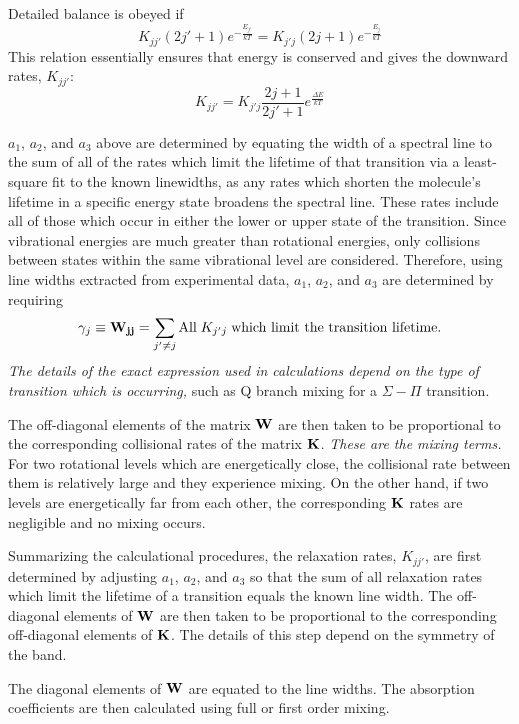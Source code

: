 \documentclass[11pt]{article}
\begin{document}
Detailed balance is obeyed if
\[
K_{jj'}(2j'+1)e^{-\frac{E_{j'}}{kT}}=K_{j'j}(2j+1)e^{-\frac{E_{j}}{kT}}
\]
This relation essentially ensures that energy is conserved and gives the
downward rates, $K_{jj'}$:
\[
K_{jj'}=K_{j'j} \frac{2j+1}{2j'+1} e^{\frac{\Delta E}{kT}}
\]

$a_{1}$, $a_{2}$, and $a_{3}$ above are determined 
by equating the width of a spectral line to the sum of all of the rates
which limit the lifetime of that transition via a least-square fit to the
known linewidths, as any rates which shorten the molecule's lifetime in a 
specific energy state broadens the spectral line. These rates include all 
of those which occur in either the lower or upper state of the transition. 
Since vibrational energies are much greater than rotational energies, only
collisions between states within the same vibrational level are considered.
Therefore, using line widths extracted from experimental data, $a_{1}$,
$a_{2}$, and $a_{3}$ are determined by requiring
\[
\gamma_{j} \equiv {\bf W_{jj}} = \sum_{j'\neq j}
\mbox{All} \; K_{j'j} \; \mbox{which limit the transition lifetime}.
\]
{\em The details of the exact expression used in calculations
depend on the type of transition which is occurring,} such as Q branch 
mixing for a $\Sigma-\Pi$ transition.

The off-diagonal elements of the matrix ${\bf W}$ are then taken to be 
proportional to the corresponding collisional rates of the matrix 
${\bf K}$.  {\it These are the mixing terms.} 
For two rotational levels which are energetically close, the collisional 
rate between them is relatively large and they experience mixing.  On the 
other hand, if two levels are energetically far from each other, the 
corresponding ${\bf K}$ rates are negligible and no mixing occurs.

Summarizing the calculational procedures, the relaxation rates, $K_{jj'}$, 
are first determined by adjusting $a_{1}$, $a_{2}$,
and $a_{3}$ so that the sum of all relaxation rates which limit the
lifetime of a transition equals the known line width.  
The off-diagonal elements of ${\bf W}$ are then taken to be proportional to 
the corresponding off-diagonal elements of ${\bf K}$.  The details of this 
step depend on the symmetry of the band.

The diagonal elements of ${\bf W}$ are equated to the line widths.
The absorption coefficients are then calculated using 
full or first order mixing.  
\end{document}
